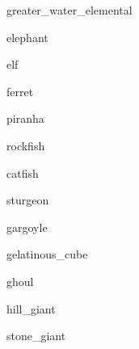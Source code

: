 \documentclass[letterpaper,serif]{module}
\begin{document}
\begin{newmonster}{greater_water_elemental}\end{newmonster}

\begin{newmonster}{elephant}\end{newmonster}

\begin{newmonster}{elf}\end{newmonster}

\begin{newmonster}{ferret}\end{newmonster}


\begin{newmonster}{piranha}\end{newmonster}

\begin{newmonster}{rockfish}\end{newmonster}

\begin{newmonster}{catfish}\end{newmonster}

\begin{newmonster}{sturgeon}\end{newmonster}

\begin{newmonster}{gargoyle}\end{newmonster}

\begin{newmonster}{gelatinous_cube}\end{newmonster}

\begin{newmonster}{ghoul}\end{newmonster}


\begin{newmonster}{hill_giant}\end{newmonster}

\begin{newmonster}{stone_giant}\end{newmonster}
\end{document}

